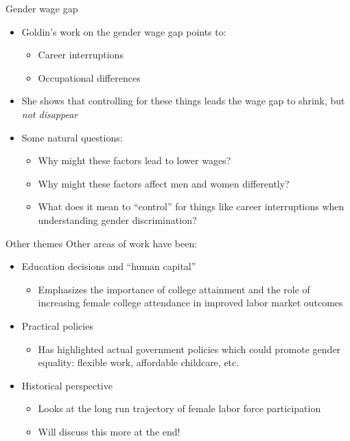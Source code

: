 \documentclass[aspectratio=169]{beamer}
\begin{document}
\begin{frame}{Gender wage gap}
    \begin{itemize}
        \item Goldin's work on the gender wage gap points to:
        \begin{itemize}
            \item Career interruptions
            \item Occupational differences
        \end{itemize}
        \item She shows that controlling for these things leads the wage gap to shrink, but \textit{not disappear}
        \item Some natural questions:
        \begin{itemize}
            \item Why might these factors lead to lower wages?
            \item Why might these factors affect men and women differently?
            \item What does it mean to ``control'' for things like career interruptions when understanding gender discrimination?     
        \end{itemize}
    \end{itemize}
\end{frame}

\begin{frame}{Other themes}
    Other areas of work have been:
    \begin{itemize}
        \item Education decisions and ``human capital''
        \begin{itemize}
            \item Emphasizes the importance of college attainment and the role of increasing female college attendance in improved labor market outcomes
        \end{itemize}
        \item Practical policies
        \begin{itemize}
            \item Has highlighted actual government policies which could promote gender equality: flexible work, affordable childcare, etc.
        \end{itemize}
        \item Historical perspective
        \begin{itemize}
            \item Looks at the long run trajectory of female labor force participation
            \item Will discuss this more at the end!
        \end{itemize}
    \end{itemize}
\end{frame}
\end{document}
